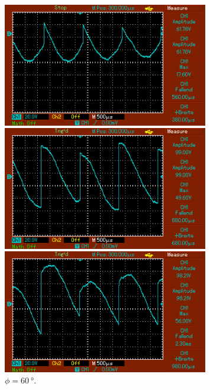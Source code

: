 \begin{figure}
    \begin{minipage}{0.5\textwidth}
        \centering
        \includegraphics[width=0.8\textwidth]{bilder/0mit.png}
        \caption{$\phi = \SI{0}{\degree}$.} 
        \label{fig:21}
    \end{minipage}
    \hfill
    \begin{minipage}{0.5\textwidth}
        \centering
        \includegraphics[width=0.8\textwidth]{bilder/60mit.png}
        \caption{$\phi = \SI{60}{\degree}$.} 
        \label{fig:22}
    \end{minipage}
    \vspace{1cm}
    \vfill
    \begin{minipage}{0.5\textwidth}
        \centering
        \includegraphics[width=0.8\textwidth]{bilder/120mit.png}

\end{minipage}
\end{figure}
